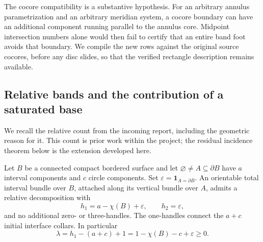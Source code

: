 The cocore compatibility is a substantive hypothesis.  For an arbitrary
annulus parametrization and an arbitrary meridian system, a cocore
boundary can have an additional component running parallel to the
annulus core.  Midpoint intersection numbers alone would then fail to
certify that an entire band foot avoids that boundary.  We compile the
new rows against the original source cocores, before any disc slides,
so that the verified rectangle description remains available.

\subsection{Relative bands and the contribution of a saturated base}
\label{geom:relative-counts}

We recall the relative count from the incoming report, including the
geometric reason for it.  This count is prior work within the project;
the residual incidence theorem below is the extension developed here.

\begin{lemma}
\label{geom:lem-relative-count}
Let $B$ be a connected compact bordered surface and let
$\varnothing\ne A\subseteq\partial B$ have $a$ interval components
and $c$ circle components.  Set
$\varepsilon=\mathbf{1}_{A=\partial B}$.  An orientable total interval
bundle over $B$, attached along its vertical bundle over $A$, admits a
relative decomposition with
\begin{equation}
 h_1=a-\chi(B)+\varepsilon,
 \qquad h_2=\varepsilon,
 \label{geom:eq-relative-count}
\end{equation}
and no additional zero- or three-handles.  The one-handles connect the
$a+c$ initial interface collars.  In particular
\[
 \lambda=h_1-(a+c)+1=1-\chi(B)-c+\varepsilon\geq0.
\]
\end{lemma}

